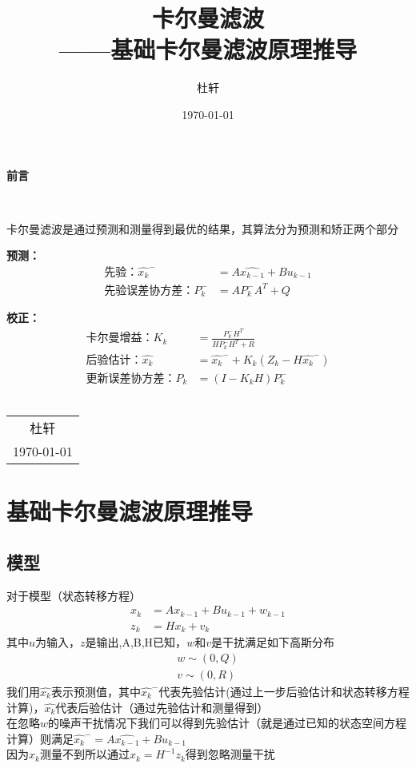 \documentclass[12pt, a4paper, oneside]{ctexbook}
\title{{\Huge{\textbf{卡尔曼滤波}}}\\——基础卡尔曼滤波原理推导}
\author{杜轩}
\date{\today}
\begin{document}
\maketitle

\setcounter{page}{1}

\begin{center}
    \Huge\textbf{前言}
\end{center}~\

卡尔曼滤波是通过预测和测量得到最优的结果，其算法分为预测和矫正两个部分

\textbf{预测：}
\begin{align*}
    \text{先验：}\hat{x_k}^-&=A\hat{x_{k-1}}+Bu_{k-1}\\
    \text{先验误差协方差：}P_k^-&=AP_k^-A^T+Q
\end{align*}

\textbf{校正：}
\begin{align*}
    \text{卡尔曼增益：}K_k&=\frac{P_k^-H^T}{HP_k^-H^T+R}\\
    \text{后验估计：}\hat{x_k}&=\hat{x_k}^-+K_k(Z_k-H\hat{x_k}^-)\\
    \text{更新误差协方差：}P_k&=(I-K_kH)P_k^-
\end{align*}
~\\
\begin{flushright}
    \begin{tabular}{c}
        杜轩\\
        \today
    \end{tabular}
\end{flushright}

\newpage
{}
\setcounter{page}{1}
\tableofcontents
\newpage
\setcounter{page}{1}

\chapter{基础卡尔曼滤波原理推导}
\section{模型}
    对于模型（状态转移方程）
    \begin{align*}
        x_k&=Ax_{k-1}+Bu_{k-1}+w_{k-1}\\
        z_k&=Hx_k+v_k
    \end{align*}
    其中$u$为输入，$z$是输出,A,B,H已知，$w$和$v$是干扰满足如下高斯分布
    \begin{align*}
        w\sim (0,Q)\\
        v\sim (0,R)
    \end{align*}
我们用$\hat{x_k}$表示预测值，其中$\hat{x_k}^-$代表先验估计(通过上一步后验估计和状态转移方程计算)，$\hat{x_k}$代表后验估计（通过先验估计和测量得到）\\
在忽略$w$的噪声干扰情况下我们可以得到先验估计（就是通过已知的状态空间方程计算）则满足$\hat{x_k}^-=A\hat{x_{k-1}}+Bu_{k-1}$\\
因为$x_k$测量不到所以通过$x_k=H^{-1}z_k$得到忽略测量干扰
\end{document}
